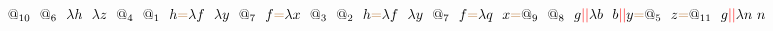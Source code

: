 \documentclass[a4paper, 10pt]{article}
\newcommand{\tikzmark}[3][]{\tikz[remember picture,baseline] \node [inner xsep=0pt,anchor=base,#1](#2) {#3};}
\begin{document}
\[\tikzmark{1}{$@_{10}$}\ \ \tikzmark{2}{$@_6$}\ \ \tikzmark{3}{$\lambda h$}\ \ \tikzmark{4}{$\lambda z$}\ \ \tikzmark{5}{$@_4$}\ \ \tikzmark{6}{$@_1$}\ \ \tikzmark{7}{$h$}\tikzmark{}{\color{brown}{=}}\tikzmark{8}{$\lambda f$}\ \ \tikzmark{9}{$\lambda y$}\ \ \tikzmark{10}{$@_7$}\ \ \tikzmark{11}{$f$}\tikzmark{}{\color{brown}{=}}\tikzmark{12}{$\lambda x$}\ \ \tikzmark{13}{$@_3$}\ \ \tikzmark{14}{$@_2$}\ \ \tikzmark{15}{$h$}\tikzmark{}{\color{brown}{=}}\tikzmark{16}{$\lambda f$}\ \ \tikzmark{17}{$\lambda y$}\ \ \tikzmark{18}{$@_7$}\ \ \tikzmark{19}{$f$}\tikzmark{}{\color{brown}{=}}\tikzmark{20}{$\lambda q$}\ \ \tikzmark{21}{$x$}\tikzmark{}{\color{brown}{=}}\tikzmark{22}{$@_9$}\ \ \tikzmark{23}{$@_8$}\ \ \tikzmark{24}{$g$}\tikzmark{}{\color{red}{||}}\tikzmark{25}{$\lambda b$}\ \ \tikzmark{26}{$b$}\tikzmark{}{\color{red}{||}}\tikzmark{27}{$y$}\tikzmark{}{\color{brown}{=}}\tikzmark{29}{$@_5$}\ \ \tikzmark{30}{$z$}\tikzmark{}{\color{brown}{=}}\tikzmark{31}{$@_{11}$}\ \ \tikzmark{32}{$g$}\tikzmark{}{\color{red}{||}}\tikzmark{33}{$\lambda n$}\ \tikzmark{34}{$n$}\]
\end{document}
